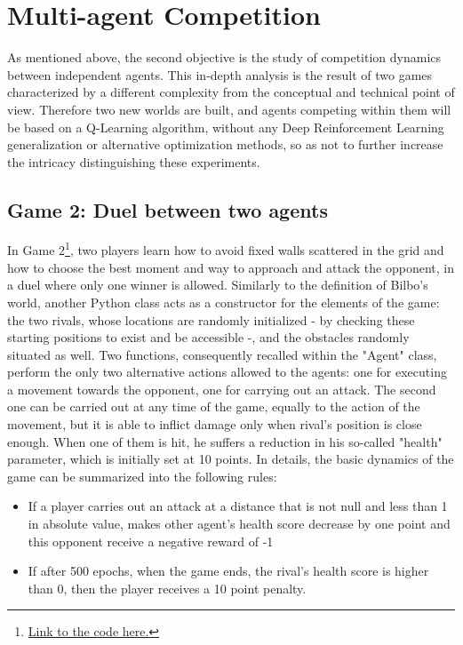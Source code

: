 
\section{Multi-agent Competition}
As mentioned above, the second objective is the study of competition dynamics between independent agents. This in-depth analysis is the result of two games characterized by a different complexity from the conceptual and technical point of view. Therefore two new worlds are built, and agents competing within them will be based on a Q-Learning algorithm, without any Deep Reinforcement Learning generalization or alternative optimization methods, so as not to further increase the intricacy distinguishing these experiments.
\subsection{Game 2: Duel between two agents}
In Game 2\footnote{\href{https://github.com/moiraghif/DragonHunting/tree/master/Duel}{Link to the code here.}}, two players learn how to avoid fixed walls scattered in the grid and how to choose the best moment and way to approach and attack the opponent, in a duel where only one winner is allowed. Similarly to the definition of Bilbo's world, another Python class acts as a constructor for the elements of the game: the two rivals, whose locations are randomly initialized - by checking these starting positions to exist and be accessible -, and the obstacles randomly situated as well. Two functions, consequently recalled within the "Agent" class, perform the only two alternative actions allowed to the agents: one for executing a movement towards the opponent, one for carrying out an attack. The second one can be carried out at any time of the game, equally to the action of the movement, but it is able to inflict damage only when rival's position is close enough. When one of them is hit, he suffers a reduction in his so-called "health" parameter, which is initially set at 10 points. In details, the basic dynamics of the game can be summarized into the following rules:
\begin{itemize}
  \item If a player carries out an attack at a distance that is not null and less than 1 in absolute value, makes other agent's health score decrease by one point and this opponent receive a negative reward of -1
  \item If after 500 epochs, when the game ends, the rival's health score is higher than 0, then the player receives a 10 point penalty.
\end{itemize}
